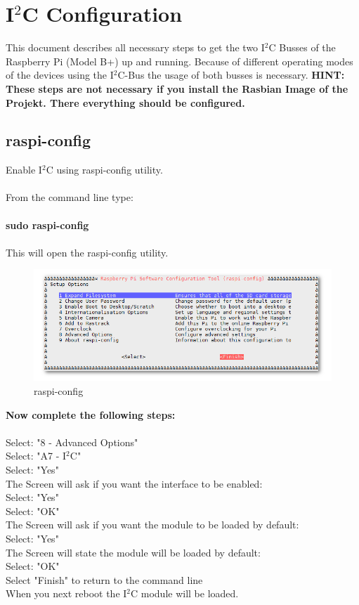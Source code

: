 \chapter{I$^2$C Configuration}
\label{chap:I2C}
This document describes all necessary steps to get the two I$^2$C Busses of the Raspberry Pi (Model B+) up and running. Because of different operating modes of the devices using the I$^2$C-Bus the usage of both busses is necessary.\newline\newline
\textbf{HINT: These steps are not necessary if you install the Rasbian Image of the Projekt. There everything should be configured.}\newline


\section{raspi-config}
\label{sec:raspiconfig}
Enable I$^2$C using raspi-config utility.\\\\
From the command line type:\\\\
\ttfamily \textbf{sudo raspi-config}\\\\
\normalfont This will open the raspi-config utility.

\begin{figure}[H]
	\centering\includegraphics[width=\textwidth]{fig/raspi_config}
	\caption{raspi-config}
	\label{fig:raspiconfig}
\end{figure}

\newpage
\textbf{Now complete the following steps:}\\\\
Select: "8 - Advanced Options"\\
Select: "A7 - I$^2$C"\\
Select: "Yes"\\
The Screen will ask if you want the interface to be enabled:\\
Select: "Yes"\\
Select: "OK"\\
The Screen will ask if you want the module to be loaded by default:\\
Select: "Yes"\\
The Screen will state the module will be loaded by default:\\
Select: "OK"\\
Select "Finish" to return to the command line \\
When you next reboot the I$^2$C module will be loaded.\\


